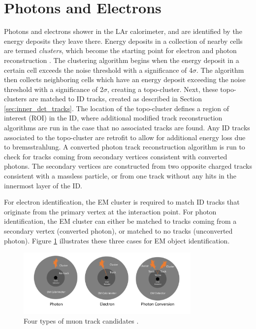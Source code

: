 \section{Photons and Electrons}
Photons and electrons shower in the LAr calorimeter, and are identified by the energy deposits they leave there. Energy deposits in a collection of nearby cells are termed \textit{clusters}, which become the starting point for electron and photon reconstruction \cite{electron_photon}. The clustering algorithm begins when the energy deposit in a certain cell exceeds the noise threshold with a significance of 4$\sigma$. The algorithm then collects neighboring cells which have an energy deposit exceeding the noise threshold with a significance of 2$\sigma$, creating a topo-cluster. Next, these topo-clusters are matched to ID tracks, created as described in Section \ref{sec:inner_det_tracks}. The location of the topo-cluster defines a region of interest (ROI) in the ID, where additional modified track reconstruction algorithms are run in the case that no associated tracks are found. Any ID tracks associated to the topo-cluster are retrofit to allow for additional energy loss due to bremsstrahlung. A converted photon track reconstruction algorithm is run to check for tracks coming from secondary vertices consistent with converted photons. The secondary vertices are constructed from two opposite charged tracks consistent with a massless particle, or from one track without any hits in the innermost layer of the ID. \par

For electron identification, the EM cluster is required to match ID tracks that originate from the primary vertex at the interaction point. For photon identification, the EM cluster can either be matched to tracks coming from a secondary vertex (converted photon), or matched to no tracks (unconverted photon). Figure \ref{fig:electron_photon_id} illustrates these three cases for EM object identification. \par

\begin{figure}
        \centering
	\includegraphics[width=0.8\textwidth]{figures/ch5/electron_photon_id}
	\caption{Four types of muon track candidates \cite{electron_photon_id}. }
	\label{fig:electron_photon_id}
\end{figure}

